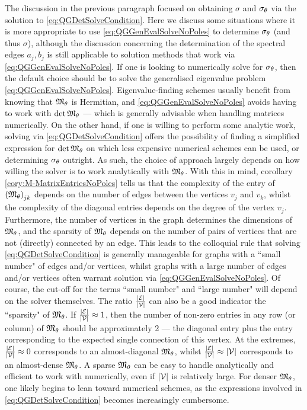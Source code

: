 The discussion in the previous paragraph focused on obtaining $\sigma$ and $\sigma_\theta$ via the solution to \eqref{eq:QGDetSolveCondition}.
Here we discuss some situations where it is more appropriate to use \eqref{eq:QGGenEvalSolveNoPoles} to determine $\sigma_{\theta}$ (and thus $\sigma$), although the discussion concerning the determination of the spectral edges $a_j, b_j$ is still applicable to solution methods that work via \eqref{eq:QGGenEvalSolveNoPoles}.
If one is looking to numerically solve for $\sigma_\theta$, then the default choice should be to solve the generalised eigenvalue problem \eqref{eq:QGGenEvalSolveNoPoles}.
Eigenvalue-finding schemes usually benefit from knowing that $\mathfrak{M}_\theta$ is Hermitian, and \eqref{eq:QGGenEvalSolveNoPoles} avoids having to work with $\det\mathfrak{M}_\theta$ --- which is generally advisable when handling matrices numerically. 
On the other hand, if one is willing to perform some analytic work, solving via \eqref{eq:QGDetSolveCondition} offers the possibility of finding a simplified expression for $\det\mathfrak{M}_\theta$ on which less expensive numerical schemes can be used, or determining $\sigma_\theta$ outright.
As such, the choice of approach largely depends on how willing the solver is to work analytically with $\mathfrak{M}_\theta$.
With this in mind, corollary \ref{cory:M-MatrixEntriesNoPoles} tells us that the complexity of the entry of $\left( \mathfrak{M}_\theta \right)_{jk}$ depends on the number of edges between the vertices $v_j$ and $v_k$, whilst the complexity of the diagonal entries depends on the degree of the vertex $v_j$.
Furthermore, the number of vertices in the graph determines the dimensions of $\mathfrak{M}_\theta$, and the sparsity of $\mathfrak{M}_\theta$ depends on the number of pairs of vertices that are not (directly) connected by an edge.
This leads to the colloquial rule that solving \eqref{eq:QGDetSolveCondition} is generally manageable for graphs with a ``small number" of edges and/or vertices, whilst graphs with a large number of edges and/or vertices often warrant solution via \eqref{eq:QGGenEvalSolveNoPoles}.
Of course, the cut-off for the terms ``small number" and ``large number" will depend on the solver themselves.
The ratio $\frac{\left\lvert \mathcal{E} \right\rvert}{\left\lvert \mathcal{V} \right\rvert}$ can also be a good indicator the ``sparsity" of $\mathfrak{M}_\theta$.
If $\frac{\left\lvert \mathcal{E} \right\rvert}{\left\lvert \mathcal{V} \right\rvert}\approx 1$, then the number of non-zero entries in any row (or column) of $\mathfrak{M}_\theta$ should be approximately 2 --- the diagonal entry plus the entry corresponding to the expected single connection of this vertex.
At the extremes, $\frac{\left\lvert \mathcal{E} \right\rvert}{\left\lvert \mathcal{V} \right\rvert}\approx 0$ corresponds to an almost-diagonal $\mathfrak{M}_\theta$, whilst $\frac{\left\lvert \mathcal{E} \right\rvert}{\left\lvert \mathcal{V} \right\rvert}\approx \left\lvert \mathcal{V} \right\rvert$ corresponds to an almost-dense $\mathfrak{M}_\theta$.
A sparse $\mathfrak{M}_\theta$ can be easy to handle analytically and efficient to work with numerically, even if $\left\lvert \mathcal{V} \right\rvert$ is relatively large.
For denser $\mathfrak{M}_\theta$, one likely begins to lean toward numerical schemes, as the expressions involved in \eqref{eq:QGDetSolveCondition} becomes increasingly cumbersome.

